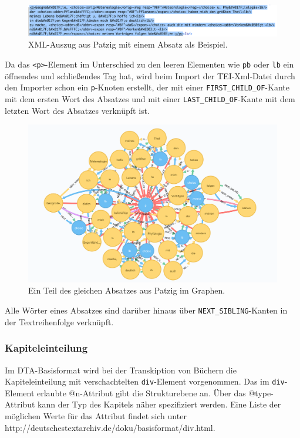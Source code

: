 \documentclass[12pt,ngerman,]{article}
\begin{document}
\begin{figure}
\centering
\includegraphics{Bilder/TEI2Graph/p-xml-Beispiel.png}
\caption{XML-Auszug aus Patzig mit einem Absatz als Beispiel.}
\end{figure}

Da das \texttt{\textless{}p\textgreater{}}-Element im Unterschied zu den
leeren Elementen wie \texttt{pb} oder \texttt{lb} ein öffnendes und
schließendes Tag hat, wird beim Import der TEI-Xml-Datei durch den
Importer schon ein \texttt{p}-Knoten erstellt, der mit einer
\texttt{FIRST\_CHILD\_OF}-Kante mit dem ersten Wort des Absatzes und mit
einer \texttt{LAST\_CHILD\_OF}-Kante mit dem letzten Wort des Absatzes
verknüpft ist.

\begin{figure}
\centering
\includegraphics{Bilder/TEI2Graph/p-graph-Beispiel.png}
\caption{Ein Teil des gleichen Absatzes aus Patzig im Graphen.}
\end{figure}

Alle Wörter eines Absatzes sind darüber hinaus über
\texttt{NEXT\_SIBLING}-Kanten in der Textreihenfolge verknüpft.

\subsubsection{Kapiteleinteilung}\label{kapiteleinteilung}

Im DTA-Basisformat wird bei der Transkiption von Büchern die
Kapiteleinteilung mit verschachtelten \texttt{div}-Element vorgenommen.
Das im \texttt{div}-Element erlaubte @n-Attribut gibt die Strukturebene
an. Über das @type-Attribut kann der Typ des Kapitels näher spezifiziert
werden. Eine Liste der möglichen Werte für das Attribut findet sich
unter http://deutschestextarchiv.de/doku/basisformat/div.html.
\end{document}
